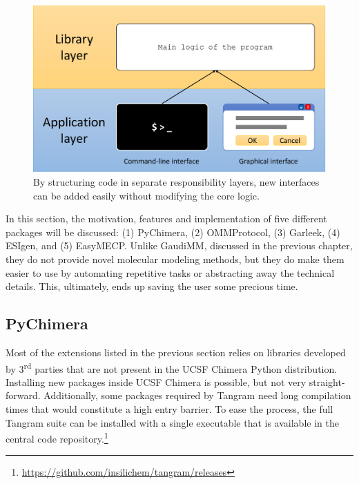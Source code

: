 \begin{figure}
	\begin{Center}
		\includegraphics[width=\textwidth]{./figures/05/library-vs-app-layers-crop.pdf}
	\end{Center}
	\caption[Uncoupled software architecture]{By structuring code in separate responsibility layers, new interfaces can be added easily without modifying the core logic.}
	\label{fig:uncoupled-layers}
\end{figure}

In this section, the motivation, features and implementation of five different packages will be discussed: (1) PyChimera, (2) OMMProtocol, (3) Garleek, (4) ESIgen, and (5) EasyMECP. Unlike GaudiMM, discussed in the previous chapter, they do not provide novel molecular modeling methods, but they do make them easier to use by automating repetitive tasks or abstracting away the technical details. This, ultimately, ends up saving the user some precious time.

\subsection{PyChimera}
\label{section:pychimera}

Most of the extensions listed in the previous section relies on libraries developed by 3\textsuperscript{rd} parties that are not present in the UCSF Chimera Python distribution. Installing new packages inside UCSF Chimera is possible, but not very straight-forward. Additionally, some packages required by Tangram need long compilation times that would constitute a high entry barrier. To ease the process, the full Tangram suite can be installed with a single executable that is available in the central code repository.\footnote{\url{https://github.com/insilichem/tangram/releases}}

